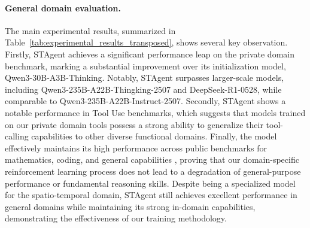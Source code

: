\documentclass{article} %
\newcommand{\model}{STAgent\xspace}
\begin{document}
\paragraph{General domain evaluation.} The main experimental results, summarized in Table~\ref{tab:experimental_results_transposed}, shows several key observation. Firstly, \model achieves a significant performance leap on the private domain benchmark, marking a substantial improvement over its initialization model, Qwen3-30B-A3B-Thinking. Notably, \model surpasses larger-scale models, including Qwen3-235B-A22B-Thingking-2507 and DeepSeek-R1-0528, while comparable to Qwen3-235B-A22B-Instruct-2507. Secondly, \model shows a notable performance in Tool Use benchmarks, which suggests that models trained on our private domain tools possess a strong ability to generalize their tool-calling capabilities to other diverse functional domains. Finally, the model effectively maintains its high performance across public benchmarks for mathematics, coding, and general capabilities , proving that our domain-specific reinforcement learning process does not lead to a degradation of general-purpose performance or fundamental reasoning skills. Despite being a specialized model for the spatio-temporal domain, \model still achieves excellent performance in general domains while maintaining its strong in-domain capabilities, demonstrating the effectiveness of our training methodology.

 





 

 
\end{document}

